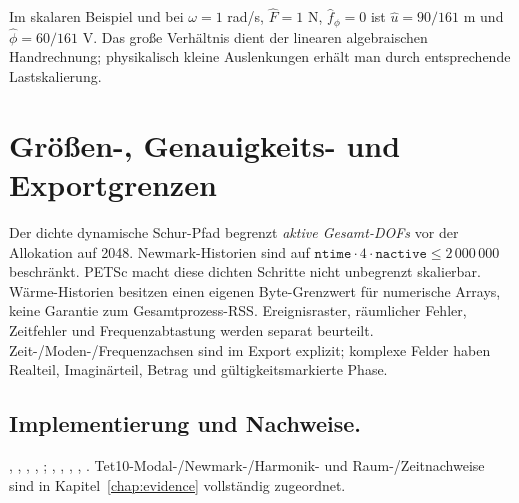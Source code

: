 Im skalaren Beispiel und bei $\omega=1$ rad/s, $\hat F=1$ N,
$\hat f_\phi=0$ ist $\hat u=90/161$ m und $\hat\phi=60/161$ V.
Das große Verhältnis dient der linearen algebraischen Handrechnung;
physikalisch kleine Auslenkungen erhält man durch entsprechende Lastskalierung.

\section{Größen-, Genauigkeits- und Exportgrenzen}
Der dichte dynamische Schur-Pfad begrenzt \emph{aktive Gesamt-DOFs} vor der
Allokation auf 2048. Newmark-Historien sind auf
$\texttt{ntime}\cdot4\cdot\texttt{nactive}\le2\,000\,000$ beschränkt.
PETSc macht diese dichten Schritte nicht unbegrenzt skalierbar.
Wärme-Historien besitzen einen eigenen Byte-Grenzwert für numerische Arrays,
keine Garantie zum Gesamtprozess-RSS. Ereignisraster, räumlicher Fehler,
Zeitfehler und Frequenzabtastung werden separat beurteilt.
Zeit-/Moden-/Frequenzachsen sind im Export explizit; komplexe Felder haben
Realteil, Imaginärteil, Betrag und gültigkeitsmarkierte Phase.

\subsection*{Implementierung und Nachweise.}
{\small\raggedright
{},
,
,
,
;
,
,
,
,
.
Tet10-Modal-/Newmark-/Harmonik- und Raum-/Zeitnachweise sind in
Kapitel~\ref{chap:evidence} vollständig zugeordnet.

\par}
